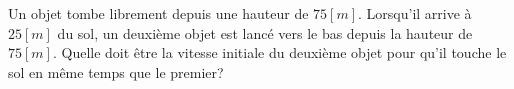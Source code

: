 \begin{exercise}
  Un objet tombe librement depuis une hauteur de \(75[m]\). Lorsqu'il arrive à \(25 [m]\) du sol, un deuxième objet est lancé vers le bas depuis la hauteur de \(75[m]\). Quelle doit être la vitesse initiale du deuxième objet pour qu'il touche le sol en même temps que le premier?
\end{exercise}
